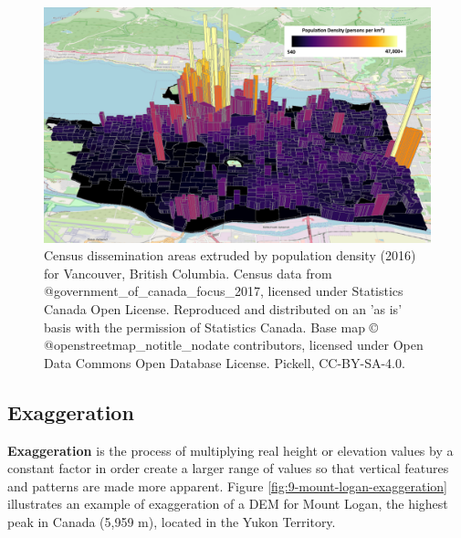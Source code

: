 \documentclass[
]{book}
\begin{document}
\begin{figure}
\includegraphics[width=0.75\linewidth]{images/09-vancouver-population-density-2016} \caption{Census dissemination areas extruded by population density (2016) for Vancouver, British Columbia. Census data from @government_of_canada_focus_2017, licensed under Statistics Canada Open License. Reproduced and distributed on an 'as is' basis with the permission of Statistics Canada. Base map © @openstreetmap_notitle_nodate contributors, licensed under Open Data Commons Open Database License. Pickell, CC-BY-SA-4.0.}\label{fig:9-vancouver-population-density-2016}
\end{figure}

\subsection{Exaggeration}\label{exaggeration}

\textbf{Exaggeration} is the process of multiplying real height or elevation values by a constant factor in order create a larger range of values so that vertical features and patterns are made more apparent. Figure \ref{fig:9-mount-logan-exaggeration} illustrates an example of exaggeration of a DEM for Mount Logan, the highest peak in Canada (5,959 m), located in the Yukon Territory.
\end{document}
